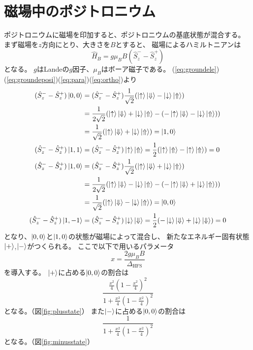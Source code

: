\section{磁場中のポジトロニウム}
ポジトロニウムに磁場を印加すると、ポジトロニウムの基底状態が混合する。
まず磁場を$z$方向にとり、大きさを$B$とすると、
磁場によるハミルトニアンは
\begin{equation}
\hat{H}_{B} = g\mu_{B}B(\hat{S}^{-}_{z} - \hat{S}^{+}_{z})
\end{equation}
となる。
$g$はLandeの$g$因子、$\mu_{B}$はボーア磁子である。%
(\ref{eq:groundele})(\ref{eq:groundeposi})(\ref{eq:para})(\ref{eq:ortho})より
\begin{align}
(\hat{S}^{-}_{z} - \hat{S}^{+}_{z})\ket{0,0} &= (\hat{S}^{-}_{z} - \hat{S}^{+}_{z})\frac{1}{\sqrt{2}} ( \ket{ \uparrow } \ket{ \Downarrow } - \ket{ \downarrow } \ket{ \Uparrow }) \notag \\
&= \frac{1}{2\sqrt{2}} ( \ket{ \uparrow } \ket{ \Downarrow } + \ket{ \downarrow } \ket{ \Uparrow } - ( - \ket{ \uparrow } \ket{ \Downarrow } - \ket{ \downarrow } \ket{ \Uparrow } )) \notag \\
&= \frac{1}{\sqrt{2}} ( \ket{ \uparrow } \ket{ \Downarrow } + \ket{ \downarrow } \ket{ \Uparrow }) = \ket{1,0} \\
(\hat{S}^{-}_{z} - \hat{S}^{+}_{z})\ket{1,1}
&= (\hat{S}^{-}_{z} - \hat{S}^{+}_{z})\ket{ \uparrow } \ket{ \Uparrow }
=\frac{1}{2}( \ket{ \uparrow } \ket{ \Uparrow } - \ket{ \uparrow } \ket{ \Uparrow } )
= 0 \\
(\hat{S}^{-}_{z} - \hat{S}^{+}_{z})\ket{1,0} &= (\hat{S}^{-}_{z} - \hat{S}^{+}_{z})\frac{1}{\sqrt{2}} ( \ket{ \uparrow } \ket{ \Downarrow } + \ket{ \downarrow } \ket{ \Uparrow }) \notag \\
&= \frac{1}{2\sqrt{2}} ( \ket{ \uparrow } \ket{ \Downarrow } - \ket{ \downarrow } \ket{ \Uparrow } - ( - \ket{ \uparrow } \ket{ \Downarrow } + \ket{ \downarrow } \ket{ \Uparrow } )) \notag \\
&= \frac{1}{\sqrt{2}} ( \ket{ \uparrow } \ket{ \Downarrow } - \ket{ \downarrow } \ket{ \Uparrow }) = \ket{0,0} \\
(\hat{S}^{-}_{z} - \hat{S}^{+}_{z})\ket{1,-1}
&= (\hat{S}^{-}_{z} - \hat{S}^{+}_{z})\ket{ \downarrow } \ket{ \Downarrow }
=\frac{1}{2}( - \ket{ \downarrow } \ket{ \Downarrow } + \ket{ \downarrow } \ket{ \Downarrow } )
= 0
\end{align}
となり、$\ket{0,0}$と$\ket{1,0}$の状態が磁場によって混合し、
新たなエネルギー固有状態$\ket{+}$,$\ket{-}$がつくられる。
ここで以下で用いるパラメータ
\begin{equation}
x = \frac{2g\mu_{B}B}{\Delta_{\mathrm{HFS}}}
\end{equation}
を導入する。
$\ket{+}$に占める$\ket{0,0}$の割合は
\begin{equation}
\frac{\frac{x^{2}}{4}(1-\frac{x^{2}}{4})^{2}}{1+\frac{x^{2}}{4}(1-\frac{x^{2}}{4})^{2}}
\end{equation}
となる。（図\ref{fig:plusstate}）
また$\ket{-}$に占める$\ket{0,0}$の割合は
\begin{equation}
\frac{1}{1+\frac{x^{2}}{4}(1-\frac{x^{2}}{4})^{2}}
\end{equation}
となる。（図\ref{fig:minusstate}）

